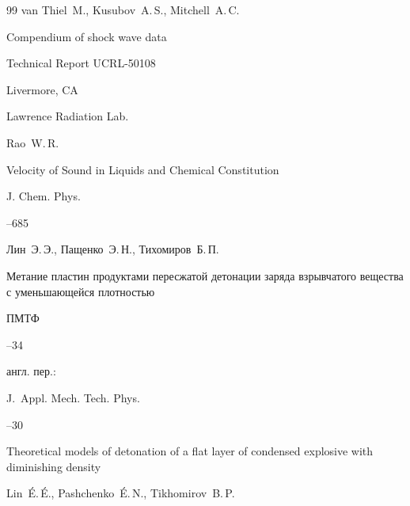 \begin{thebibliography}{99}
\by van Thiel~M., Kusubov~A.\,S., Mitchell~A.\,C.

\preprint Compendium of shock wave data

\preprintinfo  Technical Report UCRL-50108

\publaddr Livermore, CA

\publ Lawrence Radiation Lab.







\by Rao~W.\,R.

\paper  Velocity of Sound in Liquids and Chemical Constitution

\jour J. Chem. Phys.



--685














\by Лин~Э.\,Э., Пащенко~Э.\,Н., Тихомиров~Б.\,П.

\paper Метание пластин продуктами пересжатой детонации заряда взрывчатого вещества с уменьшающейся плотностью

\jour ПМТФ



--34

\transl англ. пер.:~

\jour J.~Appl. Mech. Tech. Phys.



--30


\paper Theoretical models of detonation of a flat layer of condensed explosive with diminishing density

\by Lin~\'E.\,\'E., Pashchenko~\'E.\,N., Tikhomirov~B.\,P.





\end{thebibliography}





\noindent

\hskip6.5cm \thedate \par\noindent

\hskip6.5cm\therevdate





\makeengtitlem





 \newpage

%


%

% 

